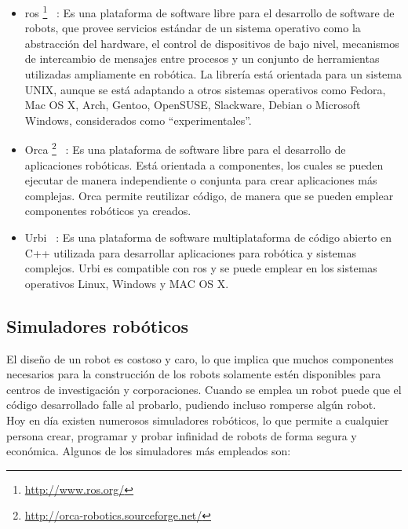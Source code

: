 \begin{itemize}
\item \acrfull{ros} \footnote{\url{http://www.ros.org/}} ~\cite{middleware1}: Es una plataforma de software libre para el desarrollo de software de robots, que provee servicios estándar de un sistema operativo como la abstracción del hardware, el control de dispositivos de bajo nivel, mecanismos de intercambio de mensajes entre procesos y un conjunto de herramientas utilizadas ampliamente en robótica. La librería está orientada para un sistema UNIX, aunque se está adaptando a otros sistemas operativos como Fedora, Mac OS X, Arch, Gentoo, OpenSUSE, Slackware, Debian o Microsoft Windows, considerados como ``experimentales''.
\item Orca \footnote{\url{http://orca-robotics.sourceforge.net/}} ~\cite{middleware1}: Es una plataforma de software libre para el desarrollo de aplicaciones robóticas. Está orientada a componentes, los cuales se pueden ejecutar de manera independiente o conjunta para crear aplicaciones más complejas. Orca permite reutilizar código, de manera que se pueden emplear componentes robóticos ya creados.
\item Urbi ~\cite{urbi}: Es una plataforma de software multiplataforma de código abierto en C++ utilizada para desarrollar aplicaciones para robótica y sistemas complejos. Urbi es compatible con \acrshort{ros} y se puede emplear en los sistemas operativos Linux, Windows y MAC OS X.
\end{itemize}

\subsection{Simuladores robóticos}
El diseño de un robot es costoso y caro, lo que implica que muchos componentes necesarios para la construcción de los robots solamente estén disponibles para centros de investigación y corporaciones. Cuando se emplea un robot puede que el código desarrollado falle al probarlo, pudiendo incluso romperse algún robot.\\

Hoy en día existen numerosos simuladores robóticos, lo que permite a cualquier persona crear, programar y probar infinidad de robots de forma segura y económica. Algunos de los simuladores más empleados son:

